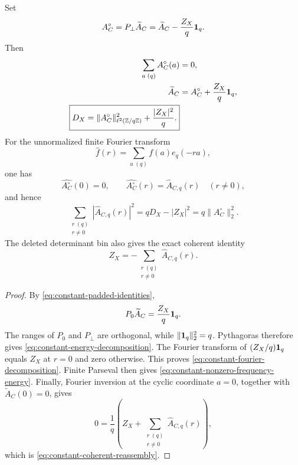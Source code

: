 \begin{theorem}
\label{thm:constant-mode}
Set
\begin{equation}
 A_C^\circ=P_\perp\widetilde A_C
 =\widetilde A_C-\frac{Z_X}{q}\mathbf 1_q.
 \label{eq:constant-centered-A}
\end{equation}
Then
\begin{align}
 \sum_{a\; (q)}A_C^\circ(a)&=0,
 \label{eq:constant-centered-sum}\\
 \widetilde A_C
 &=A_C^\circ+\frac{Z_X}{q}\mathbf 1_q,
 \label{eq:constant-decomposition}\\
 \boxed{
 D_X
 =\|A_C^\circ\|_{\ell^2(\mathbb Z/q\mathbb Z)}^2
  +\frac{|Z_X|^2}{q}.}
 \label{eq:constant-energy-decomposition}
\end{align}
For the unnormalized finite Fourier transform
\[
 \widehat f(r)=\sum_{a\; (q)}f(a)e_q(-ra),
\]
one has
\begin{equation}
 \widehat{A_C^\circ}(0)=0,
 \qquad
 \widehat{A_C^\circ}(r)
 =\widehat A_{C,q}(r)\quad(r\ne0),
 \label{eq:constant-fourier-decomposition}
\end{equation}
and hence
\begin{equation}
 \boxed{
 \sum_{\substack{r\; (q)\\r\ne0}}
 |\widehat A_{C,q}(r)|^2
 =qD_X-|Z_X|^2
 =q\|A_C^\circ\|_2^2.}
 \label{eq:constant-nonzero-frequency-energy}
\end{equation}
The deleted determinant bin also gives the exact coherent identity
\begin{equation}
 \boxed{
 Z_X=-\sum_{\substack{r\; (q)\\r\ne0}}
       \widehat A_{C,q}(r).}
 \label{eq:constant-coherent-reassembly}
\end{equation}
\end{theorem}

\begin{proof}
By \eqref{eq:constant-padded-identities},
\[
 P_0\widetilde A_C=\frac{Z_X}{q}\mathbf 1_q.
\]
The ranges of \(P_0\) and \(P_\perp\) are orthogonal, while
\(\|\mathbf 1_q\|_2^2=q\).  Pythagoras therefore gives
\eqref{eq:constant-energy-decomposition}.  The Fourier transform of
\((Z_X/q)\mathbf 1_q\) equals \(Z_X\) at \(r=0\) and zero otherwise.
This proves \eqref{eq:constant-fourier-decomposition}.  Finite
Parseval then gives
\eqref{eq:constant-nonzero-frequency-energy}.  Finally, Fourier
inversion at the cyclic coordinate \(a=0\), together with
\(\widetilde A_C(0)=0\), gives
\[
 0=\frac1q\left(
 Z_X+\sum_{\substack{r\; (q)\\r\ne0}}
 \widehat A_{C,q}(r)\right),
\]
which is \eqref{eq:constant-coherent-reassembly}.
\end{proof}

